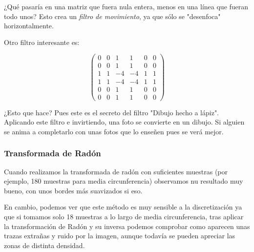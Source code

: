 		¿Qué pasaría en una matriz que fuera nula entera, menos en una línea que fueran todo unos?  Esto crea un \emph{filtro de movimiento}, ya que sólo se "desenfoca" horizontalmente.


		Otro filtro interesante es:

		\[ \begin{pmatrix}
			0 & 0 & 1 & 1 & 0 & 0\\
			0 & 0 & 1 & 1 & 0 & 0\\
			1 & 1 & -4 & -4  & 1 & 1\\
			1 & 1 & -4 & -4  & 1 & 1\\
			0 & 0 & 1 & 1 & 0 & 0\\
			0 & 0 & 1 & 1 & 0 & 0
			\end{pmatrix}\]

		¿Esto que hace? Pues este es el secreto del filtro "Dibujo hecho a lápiz". Aplicando este filtro e invirtiendo, una foto se convierte en un dibujo. Si alguien se anima a completarlo con unas fotos que lo enseñen pues se verá mejor.


	\subsubsection{Transformada de Radón}

		Cuando realizamos la transformada de radón con suficientes muestras (por ejemplo, 180 muestras para media circunferencia) observamos nu resultado muy bueno, con unos bordes más suavizados si eso.

		En cambio, podemos ver que este método es muy sensible a la discretización ya que si tomamos solo 18 muestras a lo largo de media circunferencia, tras aplicar la transformación de Radón y su inversa podemos comprobar como aparecen unas trazas extrañas y ruido por la imagen, aunque todavía se pueden apreciar las zonas de distinta densidad.








